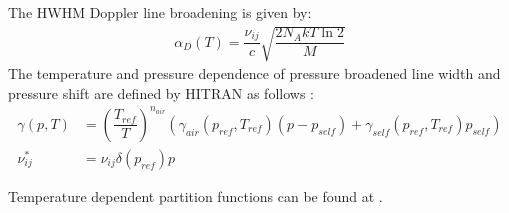 The HWHM Doppler line broadening is given by: 
\begin{align*}
	\alpha_D(T) = \dfrac{\nu_{ij}}{c} \sqrt{\dfrac{2 N_A k T \ln 2}{M}}
\end{align*}
The temperature and pressure dependence of pressure broadened line width and pressure shift are defined by HITRAN as follows \cite{hitran2}: 
\begin{align*}
	\gamma(p, T) &= \left(\dfrac{T_{ref}}{T}\right)^{n_{air}}  
	               \left(  \gamma_{air} (p_{ref}, T_{ref}) (p - p_{self}) +
	                       \gamma_{self}(p_{ref}, T_{ref}) p_{self}  \right) 		 \\
	\nu_{ij}^*   &= \nu_{ij} \delta(p_{ref}) p
\end{align*}

Temperature dependent partition functions can be found at \cite{hitran3}.